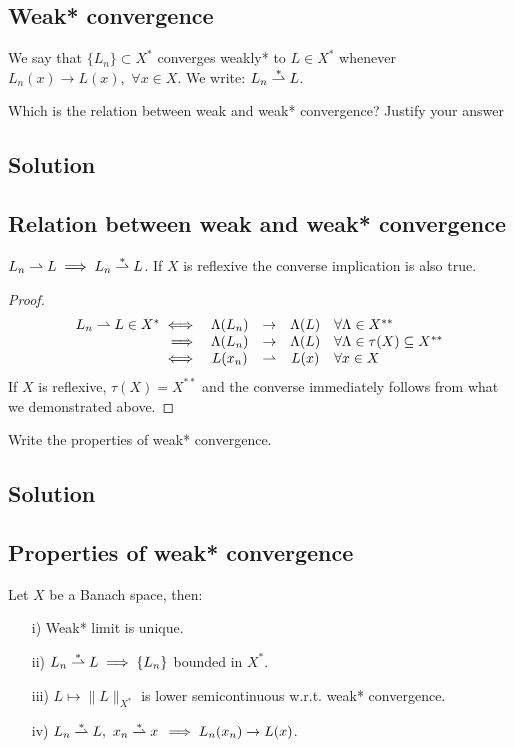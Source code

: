 \subsection{Weak* convergence}
We say that $\{L_n\}\subset X^*$ converges weakly* to $L\in X^*$ whenever $L_n(x)\to L(x) ,\,\, \forall x\in X$. We write: $L_n \overset{\ast}{\rightharpoonup} L $.


\question
Which is the relation between weak and weak* convergence? Justify your answer

\subsection*{Solution}

\subsection{Relation between weak and weak* convergence}
$L_n \rightharpoonup L \implies L_n \overset{\ast}{\rightharpoonup} L$. If $X$ is reflexive the converse implication is also true.

\begin{proof}
\[
\begin{array}{rcccl}
L_n \rightharpoonup L \in X^{ *}\iff & \Lambda (L_n)  & \to & \Lambda(L) & \forall \Lambda\in X^{**} \\
\implies & \Lambda (L_n) & \to & \Lambda(L) &  \forall \Lambda\in \tau(X) \subseteq X^{**}\\
\iff & L(x_n) & \rightharpoonup & L(x) & \forall x \in X \\
\end{array}\]
    If $X$ is reflexive, $\tau(X)=X^{**}$ and the converse immediately follows from what we demonstrated above.
\end{proof}


\question
Write the properties of weak* convergence.

\subsection*{Solution}

\subsection{Properties of weak* convergence}
Let $X$ be a Banach space, then:
\begin{itemize}
    \item[i)] Weak* limit is unique.
    \item[ii)] $L_n \overset{\ast}{\rightharpoonup} L \implies \{L_n\}$ bounded in $X^*$.
    \item[iii)] $L\mapsto \|L\|_{X^*}$ is lower semicontinuous w.r.t. weak* convergence.
    \item[iv)] $L_n \overset{\ast}{\rightharpoonup} L,\,\,x_n \overset{\ast}{\rightharpoonup} x \,\implies L_n(x_n)\to L(x)$.
\end{itemize}

